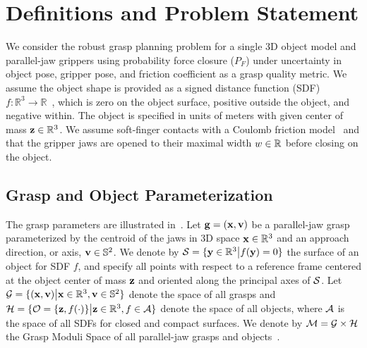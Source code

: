 \section{Definitions and Problem Statement}

We consider the robust grasp planning problem for a single 3D object model and parallel-jaw grippers using probability force closure ($P_F$)  under uncertainty in object pose, gripper pose, and friction coefficient as a grasp quality metric.
We assume the object shape is provided as a signed distance function (SDF) $f: \mathbb{R}^3 \rightarrow \mathbb{R}$~\cite{mahler2015gp}, which is zero on the object surface, positive outside the object, and negative within. 
The object is specified in units of meters with given center of mass $\mathbf{z} \in \mathbb{R}^3$.
We assume soft-finger contacts with a Coulomb friction model~\cite{zheng2005} and that the gripper jaws are opened to their maximal width $w \in\mathbb{R}$ before closing on the object.

\subsection{Grasp and Object Parameterization}
The grasp parameters are illustrated in~.
Let $\mathbf{g} = (\mathbf{x}, \mathbf{v})$ be a parallel-jaw grasp parameterized by the centroid of the jaws in 3D space $\mathbf{x} \in \mathbb{R}^3$ and an approach direction, or axis, $\mathbf{v} \in \mathbb{S}^2$.
We denote by $\mathcal{S} = \{\mathbf{y} \in \mathbb{R}^3 \big| f(\mathbf{y}) = 0\}$ the surface of an object for SDF $f$, and specify all points with respect to a reference frame centered at the object center of mass $\mathbf{z}$ and oriented along the principal axes of $\mathcal{S}$.
Let $\mathcal{G} = \{ (\mathbf{x}, \mathbf{v}) \big| \mathbf{x} \in \mathbb{R}^3, \mathbf{v} \in \mathbb{S}^2\}$ denote the space of all grasps and $\mathcal{H} = \{ \mathcal{O} = \{\mathbf{z}, f(\cdot)\} \big|  \mathbf{z} \in \mathbb{R}^3, f \in \mathcal{A}\}$ denote the space of all objects, where $\mathcal{A}$ is the space of all SDFs for closed and compact surfaces.
We denote by $\mathcal{M} = \mathcal{G} \times \mathcal{H}$ the Grasp Moduli Space of all parallel-jaw grasps and objects~\cite{pokorny2013grasp}.

